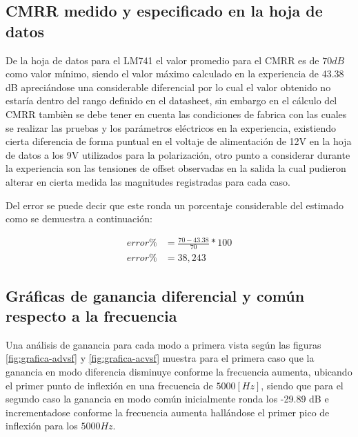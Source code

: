 \subsection{CMRR medido y especificado en la hoja de datos}

De la hoja de datos para el LM741 el valor promedio para el CMRR es de $70 dB$ como valor mínimo, siendo el valor máximo calculado en la experiencia de 43.38 dB apreciándose una considerable diferencial por lo cual el valor obtenido no estaría dentro del rango definido en el datasheet, sin embargo en el cálculo del CMRR tambièn se debe tener en cuenta las condiciones de fabrica con las cuales se realizar las pruebas y los parámetros eléctricos en la experiencia, existiendo cierta diferencia de forma puntual en el voltaje de alimentación de 12V en la hoja de datos a los 9V utilizados para la polarización, otro punto a considerar durante la experiencia son las tensiones de offset observadas en la salida la cual pudieron alterar en cierta medida las magnitudes registradas para cada caso.

Del error se puede decir que este ronda un porcentaje considerable del estimado como se demuestra a continuación:

\begin{align}
	error \% &= \frac{70 - 43.38}{70}*100 \\
	error \% &= 38,243
\end{align}

\subsection{Gráficas de ganancia diferencial y común respecto a la frecuencia}

Una análisis de ganancia para cada modo a primera vista según las figuras \ref{fig:grafica-advsf} y \ref{fig:grafica-acvsf} muestra para el primera caso que la ganancia en modo diferencia disminuye conforme la frecuencia aumenta, ubicando el primer punto de inflexión en una frecuencia de $5000 [Hz]$, siendo que para el segundo caso la ganancia en modo común inicialmente ronda los -29.89 dB e incrementadose conforme la frecuencia aumenta hallándose el primer pico de inflexión para los $5000 Hz$.


